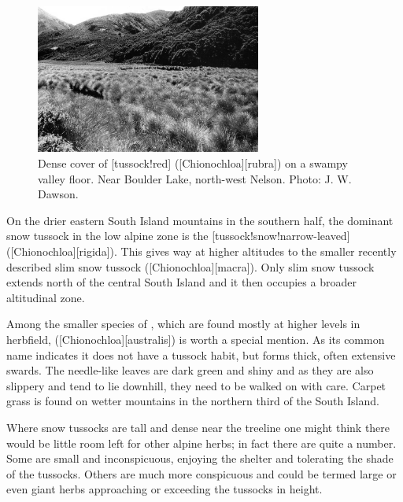 \begin{figure}
	\includegraphics[width=0.66\textwidth]{graphics/figure97red-tussock.jpg}
	\centering
	\caption[Red tussock]{Dense cover of [tussock!red] ([Chionochloa][rubra]) on a swampy valley floor.
	Near Boulder Lake, north-west Nelson.
	Photo: J. W. Dawson.}%
	\label{fig:97red-tussock}
\end{figure}

On the drier eastern South Island mountains in the southern half, the dominant snow tussock in the low alpine zone is the [tussock!snow!narrow-leaved] ([Chionochloa][rigida]).
This gives way at higher altitudes to the smaller recently described slim snow tussock ([Chionochloa][macra]).
Only slim snow tussock extends north of the central South Island and it then occupies a broader altitudinal zone.

Among the smaller species of , which are found mostly at higher levels in herbfield,  ([Chionochloa][australis]) is worth a special mention.
As its common name indicates it does not have a tussock habit, but forms thick, often extensive swards.
The needle-like leaves are dark green and shiny and as they are also slippery and tend to lie downhill, they need to be walked on with care.
Carpet grass is found on wetter mountains in the northern third of the South Island.

Where snow tussocks are tall and dense near the treeline one might think there would be little room left for other alpine herbs; in fact there are quite a number.
Some are small and inconspicuous, enjoying the shelter and tolerating the shade of the tussocks.
Others are much more conspicuous and could be termed large or even giant herbs approaching or exceeding the tussocks in height.

